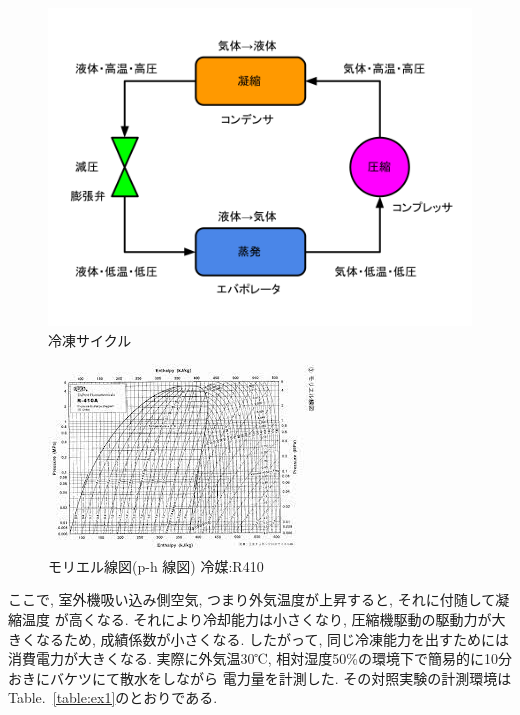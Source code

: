 \documentclass[a4j,fleqn,dvipdfmx,uplatex]{jsarticle}
\newcommand{\tableref}[1]{Table.\ \ref{#1}}
\begin{document}
\begin{figure}[hhtb]
  \centering
      \includegraphics[width=0.8\linewidth]{img/cycle-2.png}
      \caption{冷凍サイクル}
      \label{fig1:cycle}
\end{figure}

\begin{figure}[hhtb]
    \centering
        \includegraphics[width=\linewidth]{img/ph線図.jpg}
        \caption{モリエル線図(p-h 線図) 冷媒:R410}
        \label{fig1:ph_r410}
\end{figure}

ここで, 室外機吸い込み側空気, つまり外気温度が上昇すると, それに付随して凝縮温度
が高くなる. それにより冷却能力は小さくなり, 圧縮機駆動の駆動力が大きくなるため, 
成績係数が小さくなる. したがって, 同じ冷凍能力を出すためには消費電力が大きくなる.  
実際に外気温30℃, 相対湿度50\%の環境下で簡易的に10分おきにバケツにて散水をしながら
電力量を計測した. その対照実験の計測環境は\tableref{table:ex1}のとおりである. 
\end{document}
